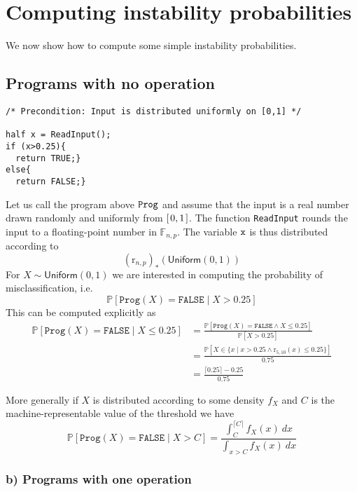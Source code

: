 \documentclass[10pt,a4paper]{article}
\theoremstyle{plain}
\theoremstyle{definition}
\newcommand{\F}[1][n,p]{\mathbb{F}_{#1}}
\newcommand{\R}{\mathbb{R}}
\newcommand{\B}{\mathbb{B}}
\newcommand{\Round}[1][n,p]{\mathrm{r}_{#1}}
\newcommand{\Unif}{\mathsf{Uniform}}
\newcommand{\ceil}[1]{\lceil #1 \rceil}
\newcommand{\intvl}[1]{\mathlarger{\left[\right.}  #1 \mathlarger{\left.\right]}}
\newcommand{\Pro}[1]{\mathbb{P}\left[ #1 \right]}
\begin{document}
\section{Computing instability probabilities}

We now show how to compute some simple instability probabilities.

\subsection{Programs with no operation}


\begin{lstlisting}
/* Precondition: Input is distributed uniformly on [0,1] */

half x = ReadInput();
if (x>0.25){
  return TRUE;}
else{
  return FALSE;} 
\end{lstlisting}

Let us call the program above $\tt Prog$ and assume that the input is a real number drawn randomly and uniformly from $\intvl{0,1}$. The function \texttt{ReadInput} rounds the input to a floating-point number in $\F$. The variable $\tt x$ is thus distributed according to
\[
(\Round)_\ast(\Unif(0,1))
\]
For $X\sim\Unif(0,1)$ we are interested in computing the probability of misclassification, i.e.\@
\[
\Pro{\mathtt{Prog}(X)=\mathtt{FALSE}\mid X> 0.25}
\]
This can be computed explicitly as
\begin{align*}
\Pro{\mathtt{Prog}(X)=\mathtt{FALSE}\mid X\leq 0.25}&=\frac{\Pro{\mathtt{Prog}(X)=\mathtt{FALSE} \wedge X\leq 0.25}}{\Pro{X> 0.25}}\\
&=\frac{\Pro{X\in \{x\mid x>0.25 \wedge \Round[5,10](x)\leq 0.25\}}}{0.75}\\
&=\frac{\ceil{0.25}-0.25}{0.75}
\end{align*}

More generally if $X$ is distributed according to some density $f_X$ and $C$ is the machine-representable value of the threshold we have
\[
\Pro{\mathtt{Prog}(X)=\mathtt{FALSE}\mid X> C}=\frac{\int_C^{\ceil{C}} f_X(x)~dx}{\int_{x>C} f_X(x)~dx}
\]


\subsubsection*{b) Programs with one operation}

\newcommand{\rRound}{\mathrm{Round}}
\end{document}
